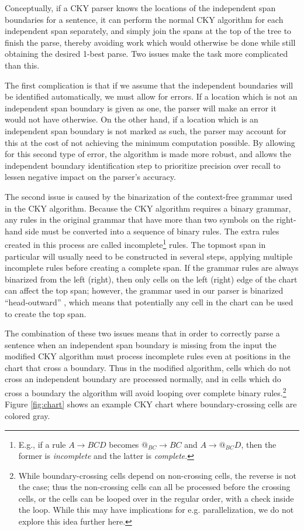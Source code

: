 \documentclass[11pt]{article}
\begin{document}
Conceptually, if a CKY parser knows the locations of the
independent span boundaries for a sentence, it can perform the normal
CKY algorithm for each independent span separately, and simply join
the spans at the top of the tree to finish the parse, thereby avoiding
work which would otherwise be done while still obtaining the desired
1-best parse. Two issues make the task more complicated than this.

The first complication is that if we assume that the independent boundaries
will be identified automatically, we must allow for errors. If a
location which is not an independent span boundary is given as one,
the parser will make an error it would not have otherwise. On the
other hand, if a location which is an independent span boundary is not
marked as such, the parser may account for this at the cost of not
achieving the minimum computation possible. By allowing for this
second type of error, the algorithm is made more robust, and allows
the independent boundary identification step to prioritize precision
over recall to lessen negative impact on the parser's accuracy.

The second issue is caused by the binarization of the context-free grammar used
in the CKY algorithm. Because the CKY algorithm requires a binary grammar, any
rules in the original grammar that have more than two symbols on the right-hand
side must be converted into a sequence of binary rules. The extra rules created
in this process are called incomplete\footnote{E.g., if a rule $A \rightarrow B C D$ becomes $@_{BC} \rightarrow B C$ and
$A \rightarrow @_{BC} D$, then the former is \emph{incomplete} and the latter is \emph{complete}.} rules. The topmost span in
particular will usually need to be constructed in several steps, applying
multiple incomplete rules before creating a complete span. If the grammar rules
are always binarized from the left (right), then only cells on the left (right)
edge of the chart can affect the top span; however, the grammar used in our
parser is binarized ``head-outward'' \cite{Klein2003}, which means that
potentially any cell in the chart can be used to create the top span.

The combination of these two issues means that in order to correctly parse a
sentence when an independent span boundary is missing from the input the
modified CKY algorithm must process incomplete rules even at positions in the
chart that cross a boundary. Thus in the modified algorithm, cells which do not
cross an independent boundary are processed normally, and in cells which do
cross a boundary the algorithm will avoid looping over complete binary rules.\footnote{While boundary-crossing cells depend on non-crossing
cells, the reverse is not the case; thus the non-crossing cells can
all be processed before the crossing cells, or the cells can be looped
over in the regular order, with a check inside the loop. While this may have
implications for e.g. parallelization, we do not explore this idea further here.}
Figure \ref{fig:chart} shows an example CKY chart where boundary-crossing cells are
colored gray.
\end{document}
